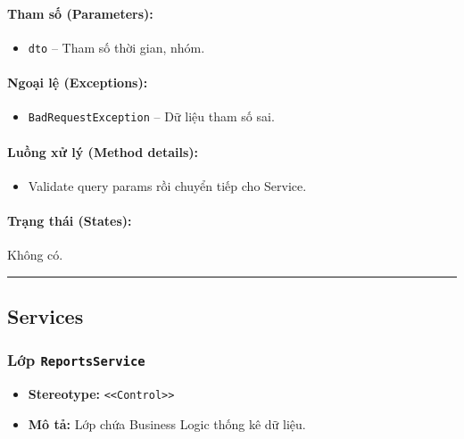 \documentclass[12pt,a4paper]{article}
\begin{document}
\paragraph{Tham số (Parameters):}
\begin{itemize}[leftmargin=*]
    \item \texttt{dto} – Tham số thời gian, nhóm.
\end{itemize}


\paragraph{Ngoại lệ (Exceptions):}
\begin{itemize}[leftmargin=*]
    \item \texttt{BadRequestException} – Dữ liệu tham số sai.
\end{itemize}


\paragraph{Luồng xử lý (Method details):}
\begin{itemize}[leftmargin=*]
    \item Validate query params rồi chuyển tiếp cho Service.
\end{itemize}


\paragraph{Trạng thái (States):}
Không có.

\vskip 0.5cm
\noindent\rule{\textwidth}{0.5pt}
\vskip 0.5cm

\subsection{Services}


\subsubsection{Lớp \texttt{ReportsService}}

\begin{itemize}[leftmargin=*]
    \item \textbf{Stereotype:} \texttt{\textless{}\textless{}Control\textgreater{}\textgreater{}}
    \item \textbf{Mô tả:} Lớp chứa Business Logic thống kê dữ liệu.
\end{itemize}
\end{document}
